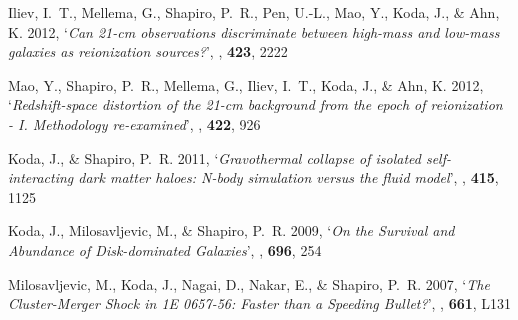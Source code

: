\begin{thebibliography}{8}
{Iliev}, I.~T., {Mellema}, G., {Shapiro}, P.~R., {Pen}, U.-L., {Mao}, Y.,
  {Koda}, J., \& {Ahn}, K. 2012, `{\it Can 21-cm observations discriminate between
  high-mass and low-mass galaxies as reionization sources?}', {\em \mnras\/},
  {\bf 423}, 2222

{Mao}, Y., {Shapiro}, P.~R., {Mellema}, G., {Iliev}, I.~T., {Koda}, J., \&
  {Ahn}, K. 2012, `{\it Redshift-space distortion of the 21-cm background from the
  epoch of reionization - I. Methodology re-examined}', {\em \mnras\/}, {\bf
  422}, 926





{Koda}, J., \& {Shapiro}, P.~R. 2011, `{\it Gravothermal collapse of isolated
  self-interacting dark matter haloes: N-body simulation versus the fluid
  model}', {\em \mnras\/}, {\bf 415}, 1125

{Koda}, J., {Milosavljevic}, M., \& {Shapiro}, P.~R. 2009{},
  `{\it On the Survival and Abundance of Disk-dominated Galaxies}', {\em \apj\/},
  {\bf 696}, 254 %

{Milosavljevic}, M., {Koda}, J., {Nagai}, D., {Nakar}, E., \& {Shapiro},
  P.~R. 2007, `{\it The Cluster-Merger Shock in 1E 0657-56: Faster than a Speeding
  Bullet?}', {\em \apjl\/}, {\bf 661}, L131 %

\end{thebibliography}

